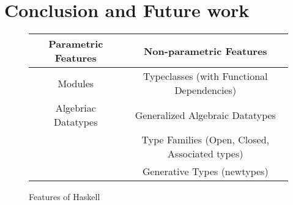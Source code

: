 \documentclass[manuscript,screen,nonacm]{acmart}
\begin{document}

\section{Conclusion and Future work}\label{sec:conclusion}
\begin{figure}[ht]
  \centering
  \begin{tabular}[ht]{c | c}
    Parametric Features & Non-parametric Features \\
    \hline
    Modules             & Typeclasses (with Functional Dependencies)\\
    Algebriac Datatypes & Generalized Algebraic Datatypes\\
                        & Type Families (Open, Closed, Associated types)\\
                        & Generative Types (newtypes)
  \end{tabular}
  \caption{Features of Haskell}
  \label{fig:haskell-lang-features}
\end{figure}
\end{document}
